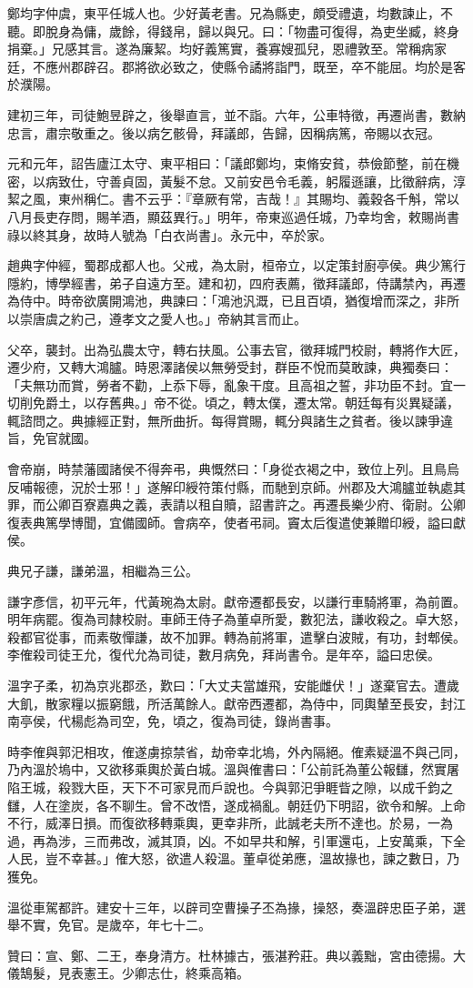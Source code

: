 \begin{pinyinscope}
鄭均字仲虞，東平任城人也。少好黃老書。兄為縣吏，頗受禮遺，均數諫止，不聽。即脫身為傭，歲餘，得錢帛，歸以與兄。曰：「物盡可復得，為吏坐臧，終身捐棄。」兄感其言。遂為廉絜。均好義篤實，養寡嫂孤兒，恩禮敦至。常稱病家廷，不應州郡辟召。郡將欲必致之，使縣令譎將詣門，既至，卒不能屈。均於是客於濮陽。

建初三年，司徒鮑昱辟之，後舉直言，並不詣。六年，公車特徵，再遷尚書，數納忠言，肅宗敬重之。後以病乞骸骨，拜議郎，告歸，因稱病篤，帝賜以衣冠。

元和元年，詔告廬江太守、東平相曰：「議郎鄭均，束脩安貧，恭儉節整，前在機密，以病致仕，守善貞固，黃髮不怠。又前安邑令毛義，躬履遜讓，比徵辭病，淳絜之風，東州稱仁。書不云乎：『章厥有常，吉哉！』其賜均、義穀各千斛，常以八月長吏存問，賜羊酒，顯茲異行。」明年，帝東巡過任城，乃幸均舍，敕賜尚書祿以終其身，故時人號為「白衣尚書」。永元中，卒於家。

趙典字仲經，蜀郡成都人也。父戒，為太尉，桓帝立，以定策封廚亭侯。典少篤行隱約，博學經書，弟子自遠方至。建和初，四府表薦，徵拜議郎，侍講禁內，再遷為侍中。時帝欲廣開鴻池，典諫曰：「鴻池汎溉，已且百頃，猶復增而深之，非所以崇唐虞之約己，遵孝文之愛人也。」帝納其言而止。

父卒，襲封。出為弘農太守，轉右扶風。公事去官，徵拜城門校尉，轉將作大匠，遷少府，又轉大鴻臚。時恩澤諸侯以無勞受封，群臣不悅而莫敢諫，典獨奏曰：「夫無功而賞，勞者不勸，上忝下辱，亂象干度。且高祖之誓，非功臣不封。宜一切削免爵土，以存舊典。」帝不從。頃之，轉太僕，遷太常。朝廷每有災異疑議，輒諮問之。典據經正對，無所曲折。每得賞賜，輒分與諸生之貧者。後以諫爭違旨，免官就國。

會帝崩，時禁藩國諸侯不得奔弔，典慨然曰：「身從衣褐之中，致位上列。且鳥烏反哺報德，況於士邪！」遂解印綬符策付縣，而馳到京師。州郡及大鴻臚並執處其罪，而公卿百寮嘉典之義，表請以租自贖，詔書許之。再遷長樂少府、衛尉。公卿復表典篤學博聞，宜備國師。會病卒，使者弔祠。竇太后復遣使兼贈印綬，謚曰獻侯。

典兄子謙，謙弟溫，相繼為三公。

謙字彥信，初平元年，代黃琬為太尉。獻帝遷都長安，以謙行車騎將軍，為前置。明年病罷。復為司隸校尉。車師王侍子為董卓所愛，數犯法，謙收殺之。卓大怒，殺都官從事，而素敬憚謙，故不加罪。轉為前將軍，遣擊白波賊，有功，封郫侯。李傕殺司徒王允，復代允為司徒，數月病免，拜尚書令。是年卒，謚曰忠侯。

溫字子柔，初為京兆郡丞，歎曰：「大丈夫當雄飛，安能雌伏！」遂棄官去。遭歲大飢，散家糧以振窮餓，所活萬餘人。獻帝西遷都，為侍中，同輿輦至長安，封江南亭侯，代楊彪為司空，免，頃之，復為司徒，錄尚書事。

時李傕與郭汜相攻，傕遂虜掠禁省，劫帝幸北塢，外內隔絕。傕素疑溫不與己同，乃內溫於塢中，又欲移乘輿於黃白城。溫與傕書曰：「公前託為董公報讎，然實屠陷王城，殺戮大臣，天下不可家見而戶說也。今與郭汜爭睚眥之隙，以成千鈞之讎，人在塗炭，各不聊生。曾不改悟，遂成禍亂。朝廷仍下明詔，欲令和解。上命不行，威澤日損。而復欲移轉乘輿，更幸非所，此誠老夫所不達也。於易，一為過，再為涉，三而弗改，滅其頂，凶。不如早共和解，引軍還屯，上安萬乘，下全人民，豈不幸甚。」傕大怒，欲遣人殺溫。董卓從弟應，溫故掾也，諫之數日，乃獲免。

溫從車駕都許。建安十三年，以辟司空曹操子丕為掾，操怒，奏溫辟忠臣子弟，選舉不實，免官。是歲卒，年七十二。

贊曰：宣、鄭、二王，奉身清方。杜林據古，張湛矜莊。典以義黜，宮由德揚。大儀鵠髮，見表憲王。少卿志仕，終乘高箱。


\end{pinyinscope}